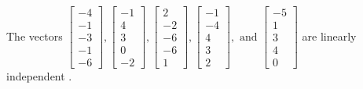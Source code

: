 \begin{exercise}
\begin{exerciseStatement}
  \end{exerciseStatement}
  \begin{exerciseAnswer}
   The vectors \(\left[\begin{array}{r}
-4 \\
-1 \\
-3 \\
-1 \\
-6
\end{array}\right] , \left[\begin{array}{r}
-1 \\
4 \\
3 \\
0 \\
-2
\end{array}\right] , \left[\begin{array}{r}
2 \\
-2 \\
-6 \\
-6 \\
1
\end{array}\right] , \left[\begin{array}{r}
-1 \\
-4 \\
4 \\
3 \\
2
\end{array}\right] , \text{ and } \left[\begin{array}{r}
-5 \\
1 \\
3 \\
4 \\
0
\end{array}\right]\) are 
  	 linearly independent  .
  


  \end{exerciseAnswer}
\end{exercise}